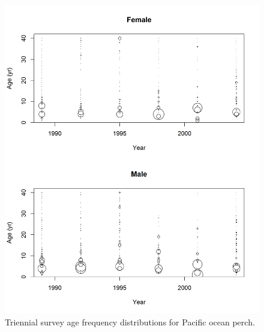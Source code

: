 \documentclass[12pt,]{article}
\begin{document}
\FloatBarrier

\begin{figure}
\centering
\includegraphics{Figures/Triennial_Ages.png}
\caption{Triennial survey age frequency distributions for Pacific ocean
perch. \label{fig:Tri_Age}}
\end{figure}

\FloatBarrier
\end{document}

